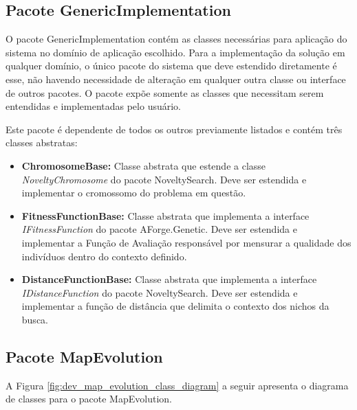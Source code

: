 \subsection{Pacote GenericImplementation}

O pacote GenericImplementation contém as classes necessárias para aplicação do sistema no domínio de aplicação escolhido. Para a implementação da solução em qualquer domínio, o único pacote do sistema que deve estendido diretamente é esse, não havendo necessidade de alteração em qualquer outra classe ou interface de outros pacotes. O pacote expõe somente as classes que necessitam serem entendidas e implementadas pelo usuário.

Este pacote é dependente de todos os outros previamente listados e contém três classes abstratas:
\vspace{-5mm}
\begin{itemize}[leftmargin=1.25\parindent]
    \item \textbf{ChromosomeBase:} Classe abstrata que estende a classe \emph{NoveltyChromosome} do pacote NoveltySearch. Deve ser estendida e implementar o cromossomo do problema em questão.
    \item \textbf{FitnessFunctionBase:} Classe abstrata que implementa a interface \emph{IFitnessFunction} do pacote AForge.Genetic. Deve ser estendida e implementar a Função de Avaliação responsável por mensurar a qualidade dos indivíduos dentro do contexto definido.
    \item \textbf{DistanceFunctionBase:} Classe abstrata que implementa a interface \emph{IDistanceFunction} do pacote NoveltySearch. Deve ser estendida e implementar a função de distância que delimita o contexto dos nichos da busca.
\end{itemize}

\subsection{Pacote MapEvolution}

A Figura \ref{fig:dev_map_evolution_class_diagram} a seguir apresenta o diagrama de classes para o pacote MapEvolution.

